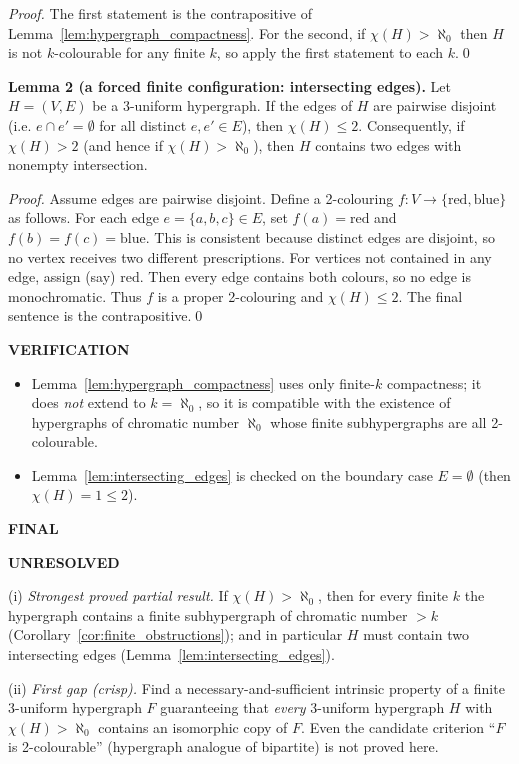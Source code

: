 \emph{Proof.}
The first statement is the contrapositive of Lemma~\ref{lem:hypergraph_compactness}.
For the second, if $\chi(H)>\aleph_0$ then $H$ is not $k$-colourable for any finite $k$, so apply the first statement to each $k$.\qed

\medskip
\noindent\textbf{Lemma 2 (a forced finite configuration: intersecting edges).}\label{lem:intersecting_edges}
Let $H=(V,E)$ be a 3-uniform hypergraph.
If the edges of $H$ are pairwise disjoint (i.e. $e\cap e'=\emptyset$ for all distinct $e,e'\in E$), then $\chi(H)\le 2$.
Consequently, if $\chi(H)>2$ (and hence if $\chi(H)>\aleph_0$), then $H$ contains two edges with nonempty intersection.

\emph{Proof.}
Assume edges are pairwise disjoint.
Define a 2-colouring $f:V\to\{\text{red},\text{blue}\}$ as follows.
For each edge $e=\{a,b,c\}\in E$, set $f(a)=\text{red}$ and $f(b)=f(c)=\text{blue}$.
This is consistent because distinct edges are disjoint, so no vertex receives two different prescriptions.
For vertices not contained in any edge, assign (say) $\text{red}$.
Then every edge contains both colours, so no edge is monochromatic.
Thus $f$ is a proper 2-colouring and $\chi(H)\le 2$.
The final sentence is the contrapositive.\qed

\bigskip
\noindent\textbf{VERIFICATION}

\begin{itemize}
\item Lemma~\ref{lem:hypergraph_compactness} uses only finite-$k$ compactness; it does \emph{not} extend to $k=\aleph_0$, so it is compatible with the existence of hypergraphs of chromatic number $\aleph_0$ whose finite subhypergraphs are all 2-colourable.
\item Lemma~\ref{lem:intersecting_edges} is checked on the boundary case $E=\emptyset$ (then $\chi(H)=1\le 2$).
\end{itemize}

\bigskip
\noindent\textbf{FINAL}

\textbf{UNRESOLVED}

(i) \emph{Strongest proved partial result.}
If $\chi(H)>\aleph_0$, then for every finite $k$ the hypergraph contains a finite subhypergraph of chromatic number $>k$ (Corollary~\ref{cor:finite_obstructions}); and in particular $H$ must contain two intersecting edges (Lemma~\ref{lem:intersecting_edges}).

(ii) \emph{First gap (crisp).}
Find a necessary-and-sufficient intrinsic property of a finite 3-uniform hypergraph $F$ guaranteeing that \emph{every} 3-uniform hypergraph $H$ with $\chi(H)>\aleph_0$ contains an isomorphic copy of $F$.
Even the candidate criterion ``$F$ is 2-colourable'' (hypergraph analogue of bipartite) is not proved here.

